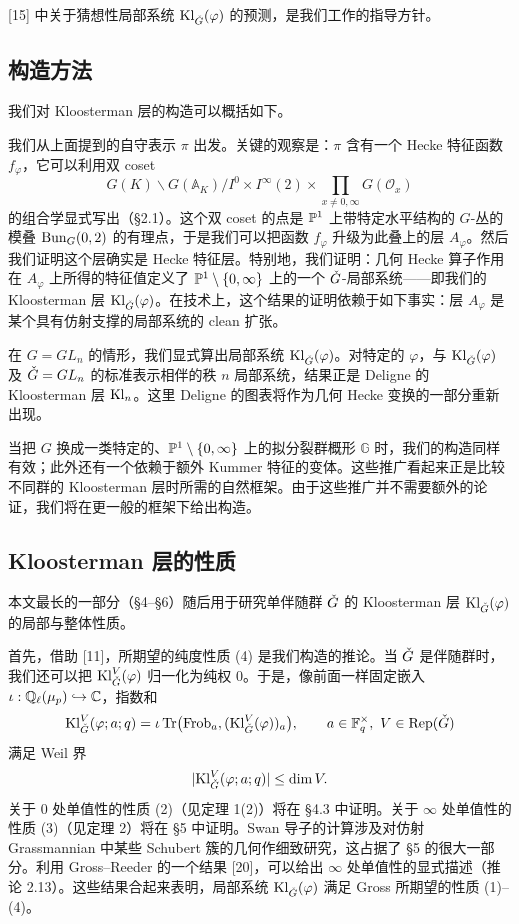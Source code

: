 [15] 中关于猜想性局部系统 $\mathrm{Kl}_{\check G}(\varphi)$ 的预测，是我们工作的指导方针。

\subsection{构造方法}

我们对 Kloosterman 层的构造可以概括如下。

我们从上面提到的自守表示 $\pi$ 出发。关键的观察是：$\pi$ 含有一个 Hecke 特征函数 $f_\varphi$，它可以利用双 coset
\[
G(K)\backslash G(\mathbb{A}_K)\Big/I^0\times I^\infty(2)\times\prod_{x\ne0,\infty}G(\mathcal O_x)
\]
的组合学显式写出（§2.1）。这个双 coset 的点是 $\mathbb{P}^1$ 上带特定水平结构的 $G$-丛的模叠 $\mathrm{Bun}_G(0,2)$ 的有理点，于是我们可以把函数 $f_\varphi$ 升级为此叠上的层 $A_\varphi$。然后我们证明这个层确实是 Hecke 特征层。特别地，我们证明：几何 Hecke 算子作用在 $A_\varphi$ 上所得的特征值定义了 $\mathbb{P}^1\setminus\{0,\infty\}$ 上的一个 $\check G$-局部系统——即我们的 Kloosterman 层 $\mathrm{Kl}_{\check G}(\varphi)$。在技术上，这个结果的证明依赖于如下事实：层 $A_\varphi$ 是某个具有仿射支撑的局部系统的 clean 扩张。

在 $G=GL_n$ 的情形，我们显式算出局部系统 $\mathrm{Kl}_{\check G}(\varphi)$。对特定的 $\varphi$，与 $\mathrm{Kl}_{\check G}(\varphi)$ 及 $\check G=GL_n$ 的标准表示相伴的秩 $n$ 局部系统，结果正是 Deligne 的 Kloosterman 层 $\mathrm{Kl}_n$。这里 Deligne 的图表将作为几何 Hecke 变换的一部分重新出现。

当把 $G$ 换成一类特定的、$\mathbb{P}^1\setminus\{0,\infty\}$ 上的拟分裂群概形 $\mathbb{G}$ 时，我们的构造同样有效；此外还有一个依赖于额外 Kummer 特征的变体。这些推广看起来正是比较不同群的 Kloosterman 层时所需的自然框架。由于这些推广并不需要额外的论证，我们将在更一般的框架下给出构造。

\subsection{Kloosterman 层的性质}

本文最长的一部分（§4–§6）随后用于研究单伴随群 $\check G$ 的 Kloosterman 层 $\mathrm{Kl}_{\check G}(\varphi)$ 的局部与整体性质。

首先，借助 [11]，所期望的纯度性质 (4) 是我们构造的推论。当 $\check G$ 是伴随群时，我们还可以把 $\mathrm{Kl}^V_{\check G}(\varphi)$ 归一化为纯权 $0$。于是，像前面一样固定嵌入 $\iota:\mathbb{Q}_\ell(\mu_p)\hookrightarrow\mathbb{C}$，指数和
\[
\mathrm{Kl}^V_{\check G}(\varphi;a;q)=\iota\,\mathrm{Tr}\big(\mathrm{Frob}_a,(\mathrm{Kl}^V_{\check G}(\varphi))_a\big),\qquad a\in\mathbb{F}_q^\times,\ V\in\mathrm{Rep}(\check G)
\]
满足 Weil 界
\[
|\mathrm{Kl}^V_{\check G}(\varphi;a;q)|\le\dim V.
\]
关于 $0$ 处单值性的性质 (2)（见定理 1(2)）将在 §4.3 中证明。关于 $\infty$ 处单值性的性质 (3)（见定理 2）将在 §5 中证明。Swan 导子的计算涉及对仿射 Grassmannian 中某些 Schubert 簇的几何作细致研究，这占据了 §5 的很大一部分。利用 Gross--Reeder 的一个结果 [20]，可以给出 $\infty$ 处单值性的显式描述（推论 2.13）。这些结果合起来表明，局部系统 $\mathrm{Kl}_{\check G}(\varphi)$ 满足 Gross 所期望的性质 (1)--(4)。

